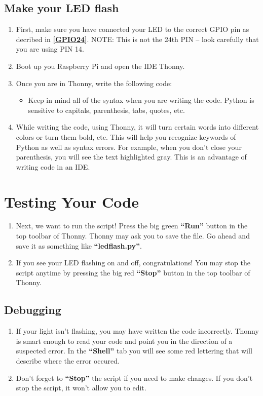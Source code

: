 \documentclass{article}\usepackage[]{graphicx}\usepackage[]{color}
\begin{document}
\subsection{Make your LED flash}

\begin{enumerate}
\item First, make sure you have connected your LED to the correct GPIO pin as decribed in \textbf{\ref{GPIO24}}. NOTE: This is not the 24th PIN -- look carefully that you are using PIN 14.
\item Boot up you Raspberry Pi and open the IDE Thonny.
\item Once you are in Thonny, write the following code: \newline

\begin{itemize}
\item Keep in mind all of the syntax when you are writing the code. Python is sensitive to capitals, parenthesis, tabs, quotes, etc.
\end{itemize}
\item While writing the code, using Thonny, it will turn certain words into different colors or turn them bold, etc. This will help you recognize keywords of Python as well as syntax errors. For example, when you don't close your parenthesis, you will see the text highlighted gray. This is an advantage of writing code in an IDE.
\end{enumerate}

\section{Testing Your Code}
\begin{enumerate}
\item Next, we want to run the script! Press the big green \textbf{``Run''} button in the top toolbar of Thonny. Thonny may ask you to save the file. Go ahead and save it as something like \textbf{``ledflash.py''}.
\item If you see your LED flashing on and off, congratulations! You may stop the script anytime by pressing the big red \textbf{``Stop''} button in the top toolbar of Thonny.
\end{enumerate}

\subsection{Debugging}
\begin{enumerate}
\item If your light isn't flashing, you may have written the code incorrectly. Thonny is smart enough to read your code and point you in the direction of a suspected error. In the \textbf{``Shell''} tab you will see some red lettering that will describe where the error occured.
\item Don't forget to \textbf{``Stop''} the script if you need to make changes. If you don't stop the script, it won't allow you to edit.
\end{enumerate}
\end{document}
